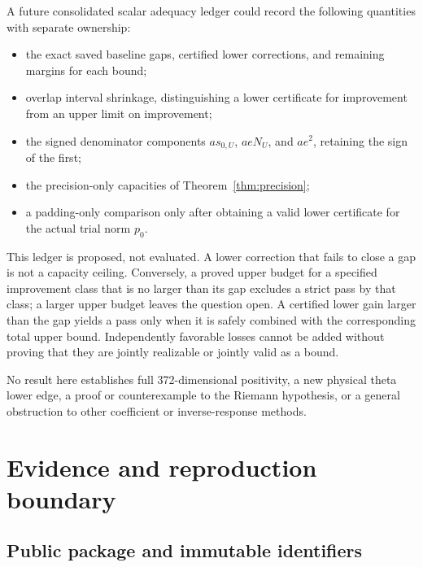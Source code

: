 \documentclass[11pt,a4paper]{article}
\theoremstyle{definition}
\theoremstyle{remark}
\numberwithin{equation}{section}
\begin{document}
A future consolidated scalar adequacy ledger could record the following
quantities with separate ownership:
\begin{itemize}
 \item the exact saved baseline gaps, certified lower corrections, and
       remaining margins for each bound;
 \item overlap interval shrinkage, distinguishing a lower certificate
       for improvement from an upper limit on improvement;
 \item the signed denominator components
       $a s_{0,U}$, $aeN_U$, and $ae^2$, retaining the sign of the first;
 \item the precision-only capacities of Theorem~\ref{thm:precision};
 \item a padding-only comparison only after obtaining a valid lower
       certificate for the actual trial norm $p_0$.
\end{itemize}
This ledger is proposed, not evaluated. A lower correction that fails
to close a gap is not a capacity ceiling. Conversely, a proved upper
budget for a specified improvement class that is no larger than its
gap excludes a strict pass by that class; a larger upper budget leaves
the question open. A certified lower gain larger than the gap yields a
pass only when it is safely combined with the corresponding total upper
bound. Independently favorable losses cannot be added without proving
that they are jointly realizable or jointly valid as a bound.

No result here establishes full 372-dimensional positivity, a new
physical theta lower edge, a proof or counterexample to the Riemann
hypothesis, or a general obstruction to other coefficient or
inverse-response methods.

\appendix
\section{Evidence and reproduction boundary}\label{app:evidence}

\subsection{Public package and immutable identifiers}
\end{document}
